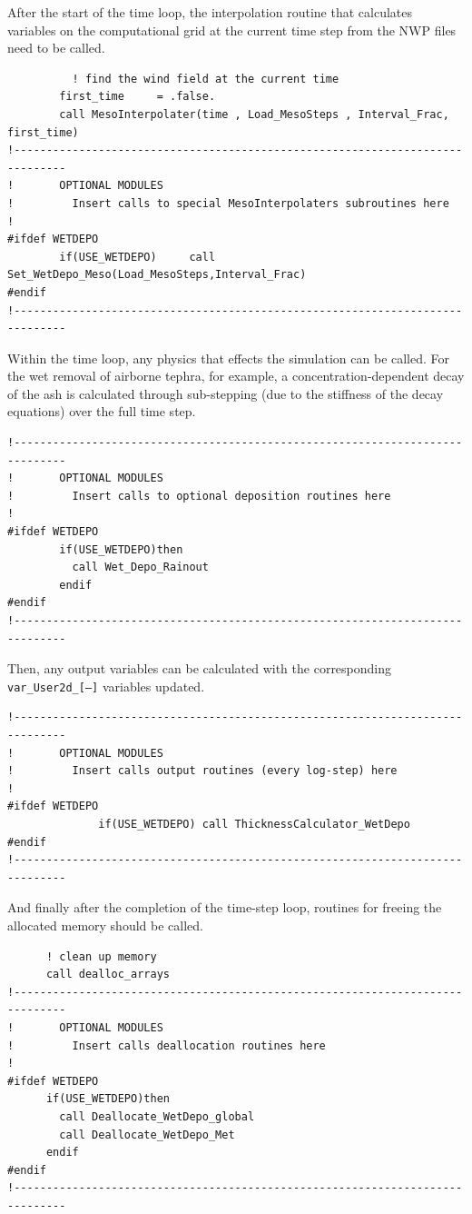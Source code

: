 After the start of the time loop, the interpolation routine that calculates
variables on the computational grid at the current time step from the NWP
files need to be called.
\small
\begin{verbatim}
          ! find the wind field at the current time
        first_time     = .false.
        call MesoInterpolater(time , Load_MesoSteps , Interval_Frac, first_time)
!------------------------------------------------------------------------------
!       OPTIONAL MODULES
!         Insert calls to special MesoInterpolaters subroutines here
!
#ifdef WETDEPO
        if(USE_WETDEPO)     call Set_WetDepo_Meso(Load_MesoSteps,Interval_Frac)
#endif
!------------------------------------------------------------------------------
\end{verbatim}
\normalsize

Within the time loop, any physics that effects the simulation can be called.
For the wet removal of airborne tephra, for example, a concentration-dependent
decay of the ash is calculated through sub-stepping (due to the stiffness of the
decay equations) over the full time step.
\small
\begin{verbatim}
!------------------------------------------------------------------------------
!       OPTIONAL MODULES
!         Insert calls to optional deposition routines here
!
#ifdef WETDEPO
        if(USE_WETDEPO)then
          call Wet_Depo_Rainout
        endif
#endif
!------------------------------------------------------------------------------
\end{verbatim}
\normalsize
Then, any output variables can be calculated with the corresponding
\texttt{var\_User2d\_[---]} variables updated.

\small
\begin{verbatim}
!------------------------------------------------------------------------------
!       OPTIONAL MODULES
!         Insert calls output routines (every log-step) here
!
#ifdef WETDEPO
              if(USE_WETDEPO) call ThicknessCalculator_WetDepo
#endif
!------------------------------------------------------------------------------
\end{verbatim}
\normalsize
And finally after the completion of the time-step loop, routines for freeing
the allocated memory should be called.
\small
\begin{verbatim}
      ! clean up memory
      call dealloc_arrays
!------------------------------------------------------------------------------
!       OPTIONAL MODULES
!         Insert calls deallocation routines here
!
#ifdef WETDEPO
      if(USE_WETDEPO)then
        call Deallocate_WetDepo_global
        call Deallocate_WetDepo_Met
      endif
#endif
!------------------------------------------------------------------------------
\end{verbatim}
\normalsize

